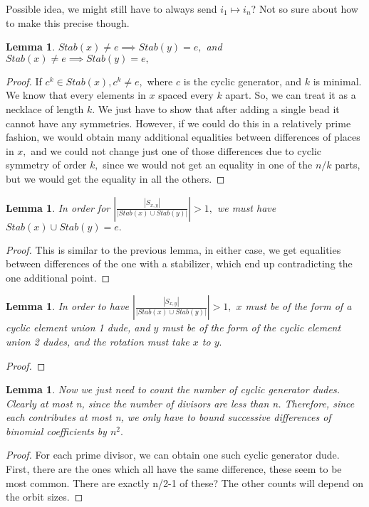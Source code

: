\documentclass{amsart}
\newtheorem{lem}[subsubsection]{Lemma}
\begin{document}
Possible idea, we might still have to always send $i_1 \mapsto i_n$? Not so sure about how to make this precise though.

\begin{lem}
$Stab(x) \neq e \implies Stab(y) = e,$ and $Stab(x) \neq e \implies Stab(y) = e,$ 
\end{lem}
\begin{proof}
If $c^k \in Stab(x),c^k \neq e,$ where $c$ is the cyclic generator, and $k$ is minimal. We know that every elements in $x$ spaced every $k$ apart. So, we can treat it as a necklace of length $k.$ We just have to show that after adding a single bead it cannot have any symmetries. However, if we could do this in a relatively prime fashion, we would obtain many additional equalities between differences of places in $x,$ and we could not change just one of those differences due to cyclic symmetry of order 
$k,$ since we would not get an equality in one of the $n/k$ parts, but we would get the equality in all the others. 
\end{proof}



\begin{lem}
In order for $|\frac{|S_{x,y}|}{|Stab(x)\cup Stab(y)|}|>1,$ we must have $Stab(x)\cup Stab(y) = e.$
\end{lem}
\begin{proof}
This is similar to the previous lemma, in either case, we get equalities between differences of the one with a stabilizer, which end up contradicting the one additional point.
\end{proof}
\begin{lem}
In order to have $|\frac{|S_{x,y}|}{|Stab(x)\cup Stab(y)|}|>1,$ $x$ must be of the form of a cyclic element union 1 dude, and $y$ must be of the form of the cyclic element union 2 dudes, and the rotation must take $x$ to $y.$
\end{lem}
\begin{proof}

\end{proof}

\begin{lem}
Now we just need to count the number of cyclic generator dudes. Clearly at most n, since the number of divisors are less than n. Therefore, since each contributes at most n, we only have to bound successive differences of binomial coefficients by $n^2.$
\end{lem}
\begin{proof}
For each prime divisor, we can obtain one such cyclic generator dude.
First, there are the ones which all have the same difference, these seem to be most common. There are exactly n/2-1 of these? The other counts will depend on the orbit sizes.
\end{proof}
\end{document}
